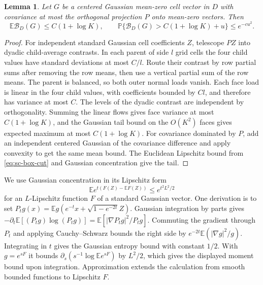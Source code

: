 \documentclass[11pt]{article}
\newtheorem{lemma}{Lemma}
\newcommand{\1}{\mathbf{1}}
\numberwithin{equation}{section}
\newcommand{\E}{\mathbb E}
\newcommand{\PP}{\mathbb P}
\begin{document}
\begin{lemma}\label{lem:sc-box-gauss}
Let \(G\) be a centered Gaussian mean-zero cell vector in \(D\)
with covariance at most the orthogonal projection \(P\) onto
mean-zero vectors. Then
\[
 \E\mathcal B_D(G)\le C(1+\log K),\qquad
 \PP\{\mathcal B_D(G)>C(1+\log K)+u\}\le e^{-c u^2}.
\]
\end{lemma}
\begin{proof}
For independent standard Gaussian cell coefficients \(Z\), telescope
\(PZ\) into dyadic child-average contrasts. In each parent of
side \(l\) grid cells the four child values have standard
deviations at most \(C/l\). Route their contrast by row partial
sums after removing the row means, then use a vertical partial
sum of the row means. The parent is balanced, so both outer
normal loads vanish. Each face load is linear in the four
child values, with coefficients bounded by \(Cl\), and
therefore has variance at most \(C\). The levels of the dyadic
contrast are independent by orthogonality. Summing the linear
flows gives face variance at most \(C(1+\log K)\), and
the Gaussian tail bound on the \(O(K^2)\) faces gives expected
maximum at most \(C(1+\log K)\). For covariance dominated by
\(P\), add an independent centered Gaussian of the covariance
difference and apply convexity to get the same mean bound.
The Euclidean Lipschitz bound from \eqref{eq:sc-box-cut}
and Gaussian concentration give the tail.
\end{proof}

We use Gaussian concentration in its Lipschitz form
\[
 \E e^{t(F(Z)-\E F(Z))}\le e^{t^2 L^2/2}
\]
for an \(L\)-Lipschitz function \(F\) of a standard Gaussian vector.
One derivation is to set \(P_tg(x)=\E g(e^{-t}x+
\sqrt{1-e^{-2t}}Z)\). Gaussian integration by parts gives
\(-\partial_t\E[(P_tg)\log(P_tg)]=\E[|\nabla P_tg|^2/P_tg]\).
Commuting the gradient through \(P_t\) and applying Cauchy--Schwarz
bounds the right side by \(e^{-2t}\E(|\nabla g|^2/g)\).
Integrating in \(t\) gives the Gaussian entropy bound with
constant \(1/2\). With \(g=e^{sF}\) it bounds
\(\partial_s(s^{-1}\log\E e^{sF})\) by \(L^2/2\), which
gives the displayed moment bound upon integration. Approximation
extends the calculation from smooth bounded functions to Lipschitz
\(F\).
\end{document}
